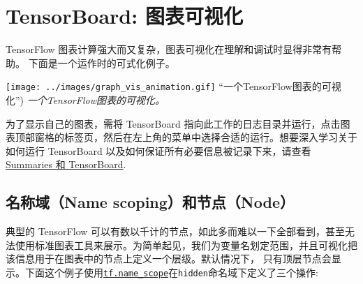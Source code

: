 

\section{TensorBoard: 图表可视化
}\label{tensorboard-ux56feux8868ux53efux89c6ux5316}

TensorFlow
图表计算强大而又复杂，图表可视化在理解和调试时显得非常有帮助。
下面是一个运作时的可式化例子。

\texttt{[image: ../images/graph\_vis\_animation.gif]}
``一个TensorFlow图表的可视化'') \emph{一个TensorFlow图表的可视化。}

为了显示自己的图表，需将 TensorBoard
指向此工作的日志目录并运行，点击图表顶部窗格的标签页，然后在左上角的菜单中选择合适的运行。想要深入学习关于如何运行
TensorBoard 以及如何保证所有必要信息被记录下来，请查看
\href{tensorflow-zh/SOURCE/how_tos/summaries_and_tensorboard/index.md}{Summaries
和 TensorBoard}.

\subsection{名称域（Name scoping）和节点（Node）
}\label{ux540dux79f0ux57dfname-scopingux548cux8282ux70b9node}

典型的 TensorFlow
可以有数以千计的节点，如此多而难以一下全部看到，甚至无法使用标准图表工具来展示。为简单起见，我们为变量名划定范围，并且可视化把该信息用于在图表中的节点上定义一个层级。默认情况下，
只有顶层节点会显示。下面这个例子使用\href{tensorflow-zh/SOURCE/api_docs/python/framework.md\#name_scope}{\texttt{tf.name\_scope}}在\texttt{hidden}命名域下定义了三个操作:

\begin{Shaded}
\begin{Highlighting}[]
  

 \NormalTok{) } 
  \OperatorTok{=} \OperatorTok{=}\NormalTok{)}
  \OperatorTok{=} \NormalTok{tf.Variable(tf.random_uniform([}\NormalTok{, }\NormalTok{], }\OperatorTok{-}\NormalTok{, }\OperatorTok{=}\NormalTok{)}
  \OperatorTok{=} \NormalTok{tf.Variable(tf.zeros([}\NormalTok{]), name}\OperatorTok{=}\NormalTok{)}
\end{Highlighting}
\end{Shaded}

